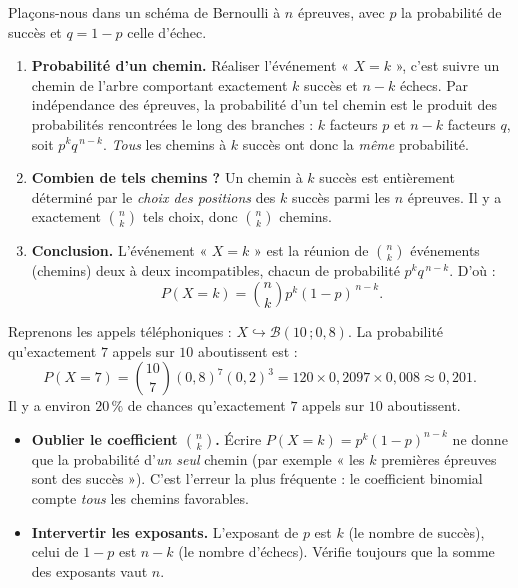 \documentclass[11pt]{article}
\begin{document}
\begin{experience}
Plaçons-nous dans un schéma de Bernoulli à $n$ épreuves, avec $p$ la probabilité de succès et $q = 1-p$ celle d'échec.
\begin{enumerate}
\item \textbf{Probabilité d'un chemin.} Réaliser l'événement « $X = k$ », c'est suivre un chemin de l'arbre comportant exactement $k$ succès et $n-k$ échecs. Par indépendance des épreuves, la probabilité d'un tel chemin est le produit des probabilités rencontrées le long des branches : $k$ facteurs $p$ et $n-k$ facteurs $q$, soit $p^k q^{\,n-k}$. \emph{Tous} les chemins à $k$ succès ont donc la \emph{même} probabilité.
\item \textbf{Combien de tels chemins ?} Un chemin à $k$ succès est entièrement déterminé par le \emph{choix des positions} des $k$ succès parmi les $n$ épreuves. Il y a exactement $\binom{n}{k}$ tels choix, donc $\binom{n}{k}$ chemins.
\item \textbf{Conclusion.} L'événement « $X = k$ » est la réunion de $\binom{n}{k}$ événements (chemins) deux à deux incompatibles, chacun de probabilité $p^k q^{\,n-k}$. D'où :
\[ P(X = k) = \binom{n}{k} p^k (1-p)^{\,n-k}. \]
\end{enumerate}
\end{experience}

\begin{exemplebox}
Reprenons les appels téléphoniques : $X \hookrightarrow \mathcal{B}(10\,;0{,}8)$. La probabilité qu'exactement $7$ appels sur $10$ aboutissent est :
\[ P(X = 7) = \binom{10}{7} (0{,}8)^7 (0{,}2)^3 = 120 \times 0{,}2097 \times 0{,}008 \approx 0{,}201. \]
Il y a environ $20\,\%$ de chances qu'exactement $7$ appels sur $10$ aboutissent.
\end{exemplebox}

\begin{attention}
\begin{itemize}
\item \textbf{Oublier le coefficient $\binom{n}{k}$.} Écrire $P(X = k) = p^k(1-p)^{n-k}$ ne donne que la probabilité d'\emph{un seul} chemin (par exemple « les $k$ premières épreuves sont des succès »). C'est l'erreur la plus fréquente : le coefficient binomial compte \emph{tous} les chemins favorables.
\item \textbf{Intervertir les exposants.} L'exposant de $p$ est $k$ (le nombre de succès), celui de $1-p$ est $n-k$ (le nombre d'échecs). Vérifie toujours que la somme des exposants vaut $n$.
\end{itemize}
\end{attention}
\end{document}
